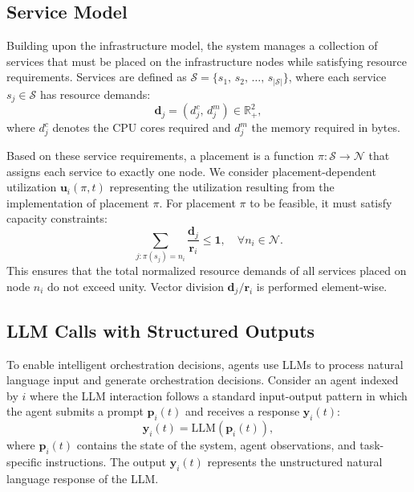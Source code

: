 \subsection{Service Model}
\label{subsec:ch5_service_model}

Building upon the infrastructure model, the system manages a collection of services that must be placed on the infrastructure nodes while satisfying resource requirements. Services are defined as $\mathcal{S} = \{s_1,\, s_2,\, \ldots,\, s_{|\mathcal{S}|}\}$, where each service $s_j \in \mathcal{S}$ has resource demands:
\begin{equation}
\mathbf{d}_j = (d_j^c,\, d_j^m) \in \mathbb{R}_+^2,
\label{eq:ch5_demand}
\end{equation}
where $d_j^c$ denotes the \ac{CPU} cores required and $d_j^m$ the memory required in bytes.

Based on these service requirements, a placement is a function $\pi: \mathcal{S} \to \mathcal{N}$ that assigns each service to exactly one node. We consider placement-dependent utilization $\mathbf{u}_i(\pi, t)$ representing the utilization resulting from the implementation of placement $\pi$. For placement $\pi$ to be feasible, it must satisfy capacity constraints:
\begin{equation}
\sum_{j: \pi(s_j) = n_i} \frac{\mathbf{d}_j}{\mathbf{r}_i} \leq \mathbf{1}, \quad \forall n_i \in \mathcal{N}.
\label{eq:ch5_capacity_constraint}
\end{equation}
This ensures that the total normalized resource demands of all services placed on node $n_i$ do not exceed unity. Vector division $\mathbf{d}_j/\mathbf{r}_i$ is performed element-wise.

\subsection{LLM Calls with Structured Outputs}
\label{subsec:ch5_llm_calls}

To enable intelligent orchestration decisions, agents use \acp{LLM} to process natural language input and generate orchestration decisions. Consider an agent indexed by $i$ where the \ac{LLM} interaction follows a standard input-output pattern in which the agent submits a prompt $\mathbf{p}_i(t)$ and receives a response $\mathbf{y}_i(t)$:
\begin{equation}
\mathbf{y}_i(t) = \text{LLM}(\mathbf{p}_i(t)),
\label{eq:ch5_llm_call}
\end{equation}
where $\mathbf{p}_i(t)$ contains the state of the system, agent observations, and task-specific instructions. The output $\mathbf{y}_i(t)$ represents the unstructured natural language response of the \ac{LLM}.

